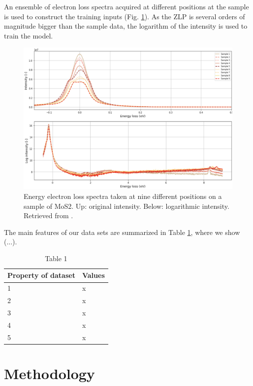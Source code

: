 \documentclass[11pt,a4paper]{article}
\numberwithin{equation}{section}
\numberwithin{figure}{section}
\numberwithin{table}{section}
\begin{document}
An ensemble of electron loss spectra acquired at different positions at the sample is used to construct the training inputs (Fig. \ref{spectra}). As the ZLP is several orders of magnitude bigger than the sample data, the logarithm of the intensity is used to train the model.

\begin{figure}[H]
    \centering
    \includegraphics[width=130mm]{plots/spectrum.png}
    \caption{Energy electron loss spectra taken at nine different positions on a sample of MoS2. Up: original intensity. Below: logarithmic intensity. Retrieved from \cite{soniamos2}. }
    \label{spectra}
\end{figure}

The main features of our data sets are summarized in Table \ref{table:spectra}, where we show (...). 

\begin{table}[H]
\centering
\begin{tabular}{|l|l|}
\hline
Property of dataset & Values \\ \hline
1                   & x      \\ \hline
2                   & x      \\ \hline
3                   & x      \\ \hline
4                   & x      \\ \hline
5                   & x      \\ \hline
\end{tabular}
\caption{Table 1}
\label{table:spectra}
\end{table}

\section{Methodology}
\end{document}
